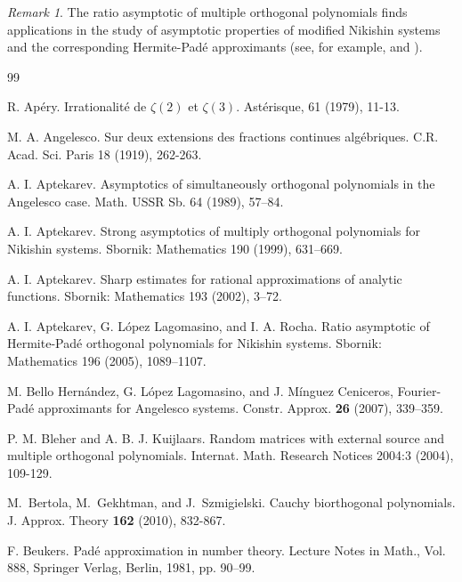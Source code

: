 \documentclass{amsart}
\theoremstyle{definition}
\theoremstyle{remark}
\newtheorem{rem}[teo]{\sc Remark}
\begin{document}
\begin{rem} The ratio asymptotic of multiple orthogonal polynomials finds applications in the study of asymptotic properties of modified Nikishin systems and the corresponding Hermite-Pad\'e approximants (see, for example, \cite{LL2} and \cite{LS2}).
\end{rem}



\begin{thebibliography}{99}

 R. Ap\'{e}ry. Irrationalit\'{e} de $\zeta(2)$ et $\zeta(3)$. Ast\'{e}risque, 61 (1979), 11-13.

 M. A. Angelesco. Sur deux extensions des fractions continues alg\'ebriques. C.R. Acad. Sci. Paris   18 (1919), 262-263.

  A. I. Aptekarev. Asymptotics of simultaneously orthogonal polynomials in the Angelesco case. Math. USSR Sb. 64 (1989), 57--84.

 A. I. Aptekarev. Strong asymptotics of multiply orthogonal polynomials for Nikishin systems.  Sbornik: Mathematics  190 (1999), 631--669.

  A. I. Aptekarev. Sharp estimates for rational approximations of analytic functions.  Sbornik: Mathematics  193 (2002), 3--72.

  A. I. Aptekarev, G. L\'opez Lagomasino, and I. A. Rocha.
Ratio asymptotic of Hermite-Pad\'{e} orthogonal polynomials
for Nikishin systems.  Sbornik: Mathematics   196 (2005), 1089--1107.

 M. Bello Hern\'andez, G. L\'opez Lagomasino, and J.
Mínguez Ceniceros, Fourier-Pad\'e approximants for Angelesco
systems. Constr. Approx. {\bf 26} (2007), 339--359.

 P. M. Bleher and A. B. J. Kuijlaars. Random matrices with external source and multiple orthogonal polynomials. Internat. Math. Research Notices 2004:3 (2004), 109-129.

M.~Bertola, M.~Gekhtman, and J.~Szmigielski. Cauchy biorthogonal polynomials.
 J. Approx. Theory {\bf 162} (2010), 832-867.

  F. Beukers. Pad\'{e} approximation in number theory. Lecture Notes in Math., Vol. 888, Springer Verlag, Berlin, 1981, pp. 90--99.



\end{thebibliography}
\end{document}
